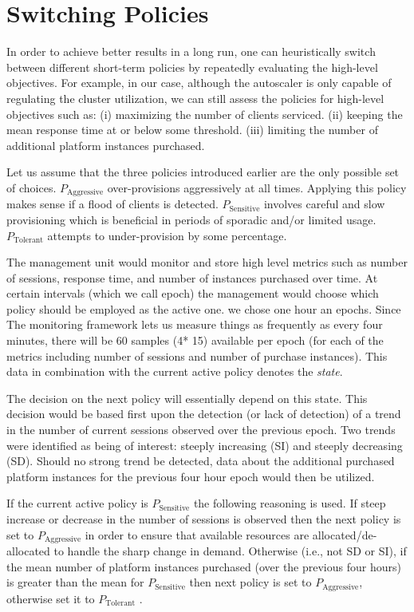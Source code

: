 \section{Switching Policies}
\label{s:switching-policies}
In order to achieve better results  in a long run, one can heuristically switch between different short-term policies 
by repeatedly evaluating the high-level objectives. 
For example, in our case, although the autoscaler is only capable of regulating the cluster utilization, we can still assess the policies for high-level objectives such as:
 (i) maximizing the number of clients serviced. 
 (ii) keeping the mean response time at or below some threshold.  
(iii) limiting the number of additional platform instances purchased.
	
	Let us assume that the three policies introduced earlier are the only possible set of choices. 
	$P_\text{Aggressive}$ over-provisions aggressively at all times. Applying this policy makes sense if a flood of clients is detected. $P_\text{Sensitive}$ involves careful and slow provisioning which is beneficial in periods of sporadic and/or limited usage. $P_\text{Tolerant}$ attempts to under-provision by some percentage. 
	
	The management unit would monitor  and store high level metrics such as number of sessions, response time, and number of instances purchased over time. At certain intervals (which we call epoch) the management would choose which policy should be employed as the active one. we chose one hour an epochs. Since The monitoring framework lets us measure things as frequently as every four minutes, there will be 60 samples (4* 15) available per epoch (for each of the metrics including number of sessions and number of purchase instances). 
This data in combination with the current active policy denotes the {\it state}. 

	The decision on the next policy will essentially depend on this state. 
	This decision would be based first upon the detection (or lack of detection) of a trend in the number of current sessions observed over the previous epoch. Two trends were identified as being of interest:  steeply increasing (SI) and steeply decreasing (SD). Should no strong trend be detected, data about the additional purchased platform instances for the previous four hour epoch would then be utilized.
	
  If the current active  policy is $P_\text{Sensitive}$ the following reasoning is used.
  If steep increase or decrease in the number of sessions is observed then the next policy is set to $P_\text{Aggressive}$ in order to ensure that available resources are allocated/de-allocated to handle the sharp change in demand. Otherwise (i.e., not SD or SI), if the mean number of platform instances purchased (over the previous four hours) is greater than the mean for  $P_\text{Sensitive}$  then  next policy is set to $P_\text{Aggressive}$, otherwise set it to $P_\text{Tolerant}$ . 
  
